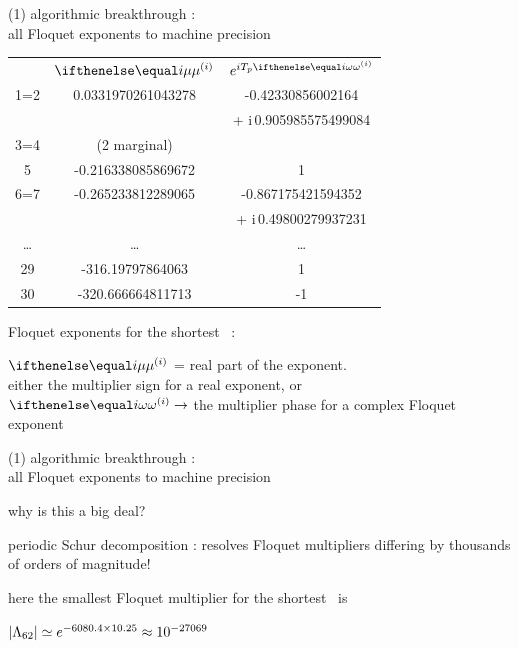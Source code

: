 \begin{frame}{(1) algorithmic breakthrough : \\
            all Floquet exponents to machine precision}
\begin{center}
\small
\begin{tabular}{  c | c | c| } %

	&  \large{$\eigRe[i]$ }  &\large{$e^{iT_{p}\eigIm[i]}$}   \\
  1=2  & 0.0331970261043278   & -0.42330856002164    \\
	& 			  & + i\,0.905985575499084 \\
  3=4  & (2 marginal) &                          \\
	5  & -0.216338085869672   & 1                         \\
  6=7  & -0.265233812289065   & -0.867175421594352   \\
	& 			  & + i\,0.49800279937231   \\
	\dots & \dots  & \dots                   \\
	29 & -316.19797864063     & 1                         \\
	30 & -320.666664811713    & -1                        \\
	\end{tabular}
	\end{center}
\bigskip

Floquet exponents for the shortest \ppo\ :

\bigskip

$\eigRe[i]$ = real part of the exponent.
\\
either
the multiplier sign for a real exponent, or
\\
$\eigIm[i] \to $
the multiplier phase for a complex Floquet exponent
\end{frame}

\begin{frame}{(1) algorithmic breakthrough : \\
            all Floquet exponents to machine precision}

why is this a big deal?
\bigskip

periodic Schur decomposition : resolves
Floquet multipliers differing by thousands of orders {of magnitude}!

\medskip

here the smallest Floquet multiplier
for the shortest \po\ is
\begin{block}{}
\begin{center}
$|\Lambda_{62}| \simeq e^{-6080.4\times 10.25} \approx 10^{-27069}$
\end{center}
\end{block}
\end{frame}


